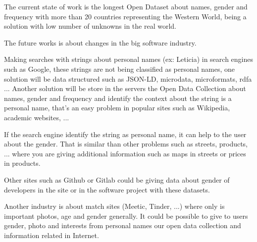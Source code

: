 \documentclass[a4paper]{article}
\begin{document}
The current state of work is the longest Open Dataset about names,
gender and frequency with more than 20 countries representing the
Western World, being a solution with low number of unknowns in the real
world.

The future works is about changes in the big software industry.

Making searches with strings about personal names (ex: Leticia) in
search engines such as Google, these strings are not being classified
as personal names, one solution will be data structured such as
JSON-LD, microdata, microformats, rdfa ... Another solution will be
store in the servers the Open Data Collection about names, gender and
frequency and identify the context about the string is a personal
name, that's an easy problem in popular sites such as Wikipedia,
academic websites, ...

If the search engine identify the string as personal name, it can help
to the user about the gender. That is similar than other problems such
as streets, products, ... where you are giving additional information
such as maps in streets or prices in products.

Other sites such as Github or Gitlab could be giving data about
gender of developers in the site or in the software project with these
datasets.

Another industry is about match sites (Meetic, Tinder, ...) where only
is important photos, age and gender generally. It could be possible to give
to users gender, photo and interests from personal names our open data
collection and information related in Internet. 




 

\end{document}

